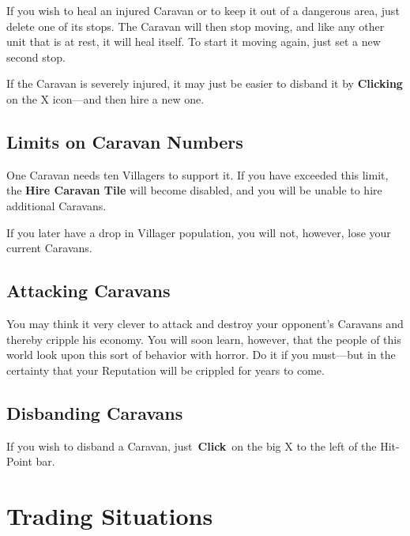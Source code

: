 
If you wish to heal an injured Caravan or to keep it out of a dangerous area, just delete one of its stops. The Caravan will then stop moving, and like any other unit that is at rest, it will heal itself. To start it moving again, just set a new second stop.

If the Caravan is severely injured, it may just be easier to disband it by \textbf{Clicking} on the X icon---and then hire a new one.

\subsection{Limits on Caravan Numbers}


One Caravan needs ten Villagers to support it. If you have exceeded this limit, the \textbf{Hire Caravan Tile} will become disabled, and you will be unable to hire additional Caravans.

If you later have a drop in Villager population, you will not, however, lose your current Caravans.

\subsection{Attacking Caravans}


 You may think it very clever to attack and destroy your opponent’s Caravans and thereby cripple his economy. You will soon learn, however, that the people of this world look upon this sort of behavior with horror. Do it if you must---but in the certainty that your Reputation will be crippled for years to come.

\subsection{Disbanding Caravans}


If you wish to disband a Caravan, just \textbf{Click} on the big X to the left of the Hit-Point bar.

\section{Trading Situations}

